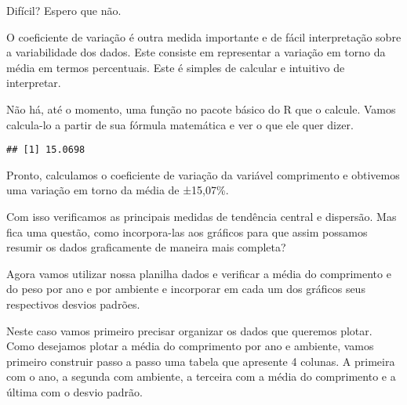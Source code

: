 \documentclass[14pt,titlepage, oneside, openany, a4paper]{book}
\newenvironment{Shaded}{\begin{snugshade}}{\end{snugshade}}
\newcommand{\DecValTok}[1]{\textcolor[rgb]{0.00,0.00,0.81}{#1}}
\newcommand{\KeywordTok}[1]{\textcolor[rgb]{0.13,0.29,0.53}{\textbf{#1}}}
\newcommand{\NormalTok}[1]{#1}
\newcommand{\OperatorTok}[1]{\textcolor[rgb]{0.81,0.36,0.00}{\textbf{#1}}}
\begin{document}
Difícil? Espero que não.

O coeficiente de variação é outra medida importante e de fácil interpretação sobre a variabilidade dos dados. Este consiste em representar a variação em torno da média em termos percentuais. Este é simples de calcular e intuitivo de interpretar.

Não há, até o momento, uma função no pacote básico do R que o calcule. Vamos calcula-lo a partir de sua fórmula matemática e ver o que ele quer dizer.

\begin{Shaded}
\end{Shaded}

\begin{verbatim}
## [1] 15.0698
\end{verbatim}

Pronto, calculamos o coeficiente de variação da variável comprimento e obtivemos uma variação em torno da média de ±15,07\%.

Com isso verificamos as principais medidas de tendência central e dispersão. Mas fica uma questão, como incorpora-las aos gráficos para que assim possamos resumir os dados graficamente de maneira mais completa?

Agora vamos utilizar nossa planilha dados e verificar a média do comprimento e do peso por ano e por ambiente e incorporar em cada um dos gráficos seus respectivos desvios padrões.

Neste caso vamos primeiro precisar organizar os dados que queremos plotar. Como desejamos plotar a média do comprimento por ano e ambiente, vamos primeiro construir passo a passo uma tabela que apresente 4 colunas. A primeira com o ano, a segunda com ambiente, a terceira com a média do comprimento e a última com o desvio padrão.
\end{document}
